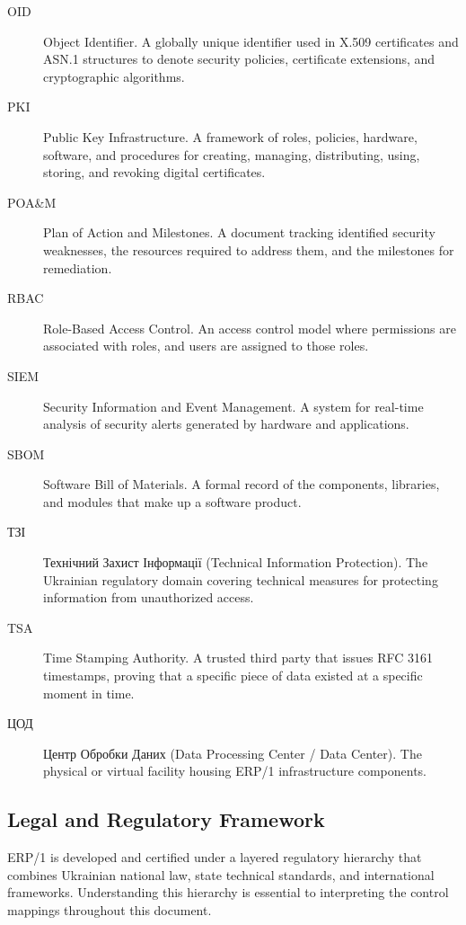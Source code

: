 \documentclass{article}
\begin{document}
\begin{description}
    \item[OID] Object Identifier. A globally unique identifier used in X.509 certificates and ASN.1 structures to denote security policies, certificate extensions, and cryptographic algorithms.
    \item[PKI] Public Key Infrastructure. A framework of roles, policies, hardware, software, and procedures for creating, managing, distributing, using, storing, and revoking digital certificates.
    \item[POA\&M] Plan of Action and Milestones. A document tracking identified security weaknesses, the resources required to address them, and the milestones for remediation.
    \item[RBAC] Role-Based Access Control. An access control model where permissions are associated with roles, and users are assigned to those roles.
    \item[SIEM] Security Information and Event Management. A system for real-time analysis of security alerts generated by hardware and applications.
    \item[SBOM] Software Bill of Materials. A formal record of the components, libraries, and modules that make up a software product.
    \item[\foreignlanguage{ukrainian}{ТЗІ}] {Технічний Захист Інформації} (Technical Information Protection). The Ukrainian regulatory domain covering technical measures for protecting information from unauthorized access.
    \item[TSA] Time Stamping Authority. A trusted third party that issues RFC 3161 timestamps, proving that a specific piece of data existed at a specific moment in time.
    \item[\foreignlanguage{ukrainian}{ЦОД}] {Центр Обробки Даних} (Data Processing Center / Data Center). The physical or virtual facility housing ERP/1 infrastructure components.

\end{description}

\subsection{Legal and Regulatory Framework}

ERP/1 is developed and certified under a layered regulatory hierarchy that combines Ukrainian national law, state technical standards, and international frameworks. Understanding this hierarchy is essential to interpreting the control mappings throughout this document.
\end{document}
